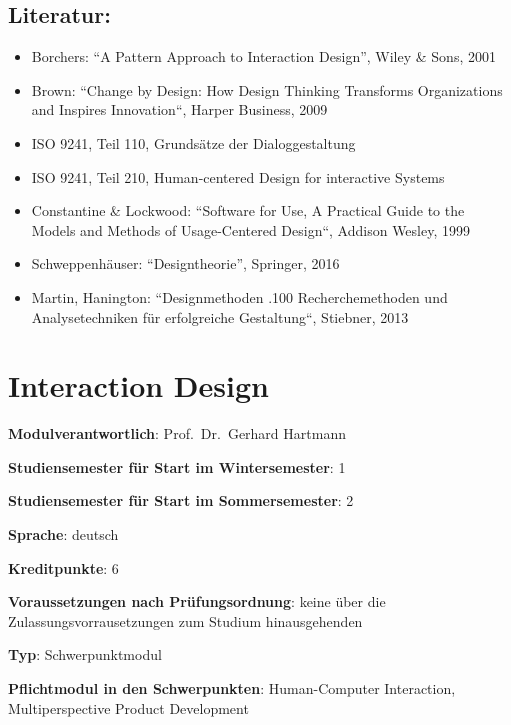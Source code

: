 \section*{Literatur:}\label{literatur-4}

\begin{itemize}
\tightlist
\item
  Borchers: ``A Pattern Approach to Interaction Design'', Wiley \& Sons,
  2001
\item
  Brown: ``Change by Design: How Design Thinking Transforms
  Organizations and Inspires Innovation``, Harper Business, 2009
\item
  ISO 9241, Teil 110, Grundsätze der Dialoggestaltung
\item
  ISO 9241, Teil 210, Human-centered Design for interactive Systems
\item
  Constantine \& Lockwood: ``Software for Use, A Practical Guide to the
  Models and Methods of Usage-Centered Design``, Addison Wesley, 1999
\item
  Schweppenhäuser: ``Designtheorie'', Springer, 2016
\item
  Martin, Hanington: ``Designmethoden .100 Recherchemethoden und
  Analysetechniken für erfolgreiche Gestaltung``, Stiebner, 2013
\end{itemize}

\chapter{Interaction Design}\label{interaction-design}

\begin{modulHead}
\textbf{Modulverantwortlich}: Prof.~Dr.~Gerhard
Hartmann
\end{modulHead}
\begin{modulHead}
\textbf{Studiensemester für
Start im Wintersemester}:
1
\end{modulHead}
\begin{modulHead}
\textbf{Studiensemester für Start
im Sommersemester}:
2
\end{modulHead}
\begin{modulHead}
\textbf{Sprache}:
deutsch
\end{modulHead}
\begin{modulHead}
\textbf{Kreditpunkte}:
6
\end{modulHead}
\begin{modulHead}
\textbf{Voraussetzungen nach
Prüfungsordnung}: keine über die Zulassungsvorrausetzungen zum Studium
hinausgehenden
\end{modulHead}
\begin{modulHead}
\textbf{Typ}:
Schwerpunktmodul
\end{modulHead}
\begin{modulHead}
\textbf{Pflichtmodul
in den Schwerpunkten}: Human-Computer Interaction, Multiperspective
Product Development
\end{modulHead}


